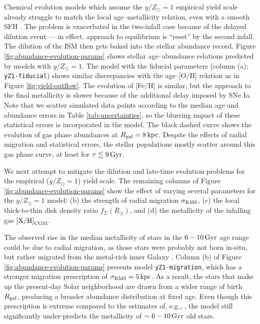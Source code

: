 \documentclass[twocolumn,twocolappendix,linenumbers]{aastex631}
\newcommand{\mathXH}{{\rm [X/H]}}
\newcommand{\yZ}[1]{$y/Z_\odot=#1$}
\newcommand{\kpc}{\,{\rm kpc}}
\newcommand{\Gyr}{\,{\rm Gyr}}
\begin{document}
Chemical evolution models which assume the \yZ{1} empirical yield scale already struggle to match the local age--metallicity relation, even with a smooth SFH \citep[see also][]{johnson_milky_2024}. The problem is exacerbated in the two-infall case because of the delayed dilution event --- in effect, approach to equilibrium is ``reset'' by the second infall. The dilution of the ISM then gets baked into the stellar abundance record.
Figure \ref{fig:abundance-evolution-params} shows stellar age--abundance relations predicted by models with \yZ{1}. The model with the fiducial parameters (column (a); {\tt yZ1-fiducial}) shows similar discrepancies with the \citet{leung_variational_2023} age--[O/H] relation as in Figure \ref{fig:yield-outflow}.
The evolution of [Fe/H] is similar, but the approach to the final metallicity is slower because of the additional delay imposed by SNe Ia. Note that we scatter simulated data points according to the median age and abundance errors in Table \ref{tab:uncertainties}, so the blurring impact of these statistical errors is incorporated in the model. The black dashed curve shows the evolution of gas phase abundances at $R_{\rm gal}=8\kpc$. Despite the effects of radial migration and statistical errors, the stellar populations mostly scatter around this gas phase curve, at least for $\tau\lesssim9\Gyr$.

We next attempt to mitigate the dilution and late-time evolution problems for the empirical (\yZ{1}) yield scale. 
The remaining columns of Figure \ref{fig:abundance-evolution-params} show the effect of varying several parameters for the \yZ{1} model: (b) the strength of radial migration $\sigma_{\rm RM8}$, (c) the local thick-to-thin disk density ratio $f_\Sigma(R_\odot)$, and (d) the metallicity of the infalling gas $\mathXH_{\rm CGM}$.

The observed rise in the median metallicity of stars in the $6-10\Gyr$ age range could be due to radial migration, as those stars were probably not born in-situ, but rather migrated from the metal-rich inner Galaxy \citep{feuillet_age-resolved_2018}. Column (b) of Figure \ref{fig:abundance-evolution-params} presents model {\tt yZ1-migration}, which has a stronger migration prescription of $\sigma_{\rm RM8}=5\kpc$. As a result, the stars that make up the present-day Solar neighborhood are drawn from a wider range of birth $R_{\rm gal}$, producing a broader abundance distribution at fixed age. Even though this prescription is extreme compared to the estimates of, e.g., \citet{frankel_measuring_2018}, the model still significantly under-predicts the metallicity of $\sim6-10\,{\rm Gyr}$ old stars.
\end{document}
